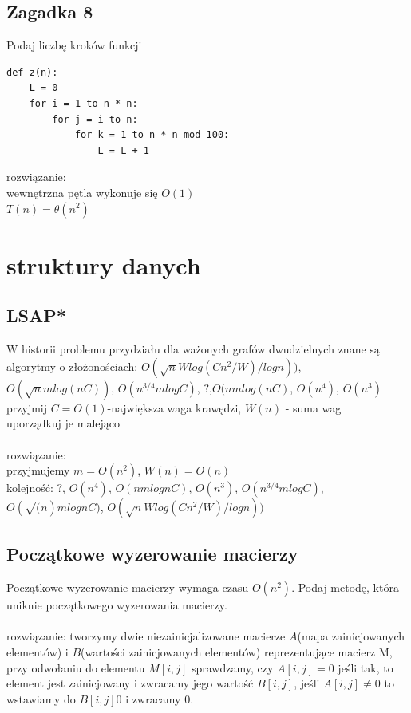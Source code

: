 \documentclass{article}
\begin{document}
\subsection*{Zagadka 8}
Podaj liczbę kroków funkcji
\begin{lstlisting}
def z(n):
	L = 0
	for i = 1 to n * n:
		for j = i to n:
			for k = 1 to n * n mod 100:
				L = L + 1
\end{lstlisting}
rozwiązanie: \\
wewnętrzna pętla wykonuje się $O(1)$ \\
$T(n) = \theta(n^2)$

\section{struktury danych}
\subsection*{LSAP*}
W historii problemu przydziału dla ważonych grafów dwudzielnych znane są algorytmy o złożonościach:
$O(\sqrt{n}Wlog(Cn^2/W)/logn))$, $O(\sqrt{n}mlog(nC))$, $O(n^{3/4}mlogC)$, $?$,$O(nmlog(nC)$, $O(n^4)$, $O(n^3)$
\\ przyjmij $C = O(1)$-największa waga krawędzi,  $W(n)$ - suma wag \\ uporządkuj je malejąco \\\\
rozwiązanie: \\
przyjmujemy $m = O(n^2)$, $ W(n) = O(n)$ \\
kolejność: $?$, $O(n^4)$,  $O(nmlognC)$, $O(n^3)$, $O(n^{3/4}mlogC)$, $O(\sqrt(n)mlognC)$, $O(\sqrt{n}Wlog(Cn^2/W)/logn))$

\subsection*{Początkowe wyzerowanie macierzy}

Początkowe wyzerowanie macierzy wymaga czasu $O(n^2)$.  Podaj metodę, która uniknie początkowego wyzerowania macierzy. \\\\
rozwiązanie:
tworzymy dwie niezainicjalizowane macierze $A$(mapa zainicjowanych elementów) i $B$(wartości zainicjowanych elementów) reprezentujące macierz M,  przy odwołaniu do elementu $M[i,j]$ sprawdzamy, czy $A[i,j] = 0$ jeśli tak, to element jest zainicjowany i zwracamy jego wartość $B[i,j]$, jeśli $A[i,j]\ne0$ to wstawiamy do $B[i,j] 0$ i zwracamy $0$. 
\end{document}
